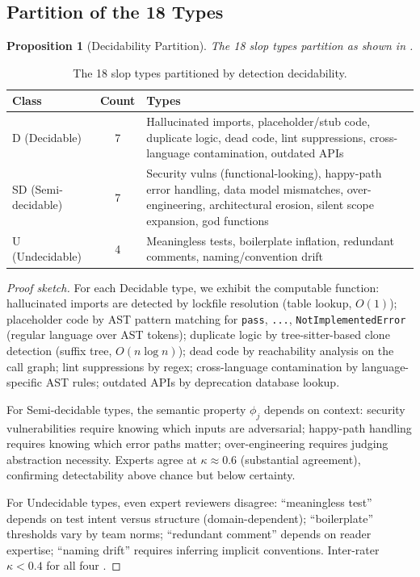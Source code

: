 \documentclass[11pt, a4paper, logo, copyright]{googledeepmind}
\newtheorem{proposition}{Proposition}[section]
\begin{document}
\subsection{Partition of the 18 Types}

\begin{proposition}[Decidability Partition]
\label{prop:partition}
The 18 slop types partition as shown in .
\end{proposition}

\begin{table}[htbp]
\centering
\caption{The 18 slop types partitioned by detection decidability.}
\label{tab:partition}
\small
\begin{tabularx}{\textwidth}{l c X}
\toprule
\textbf{Class} & \textbf{Count} & \textbf{Types} \\
\midrule
D (Decidable) & 7 & Hallucinated imports, placeholder/stub code, duplicate logic, dead code, lint suppressions, cross-language contamination, outdated APIs \\
\addlinespace
SD (Semi-decidable) & 7 & Security vulns (functional-looking), happy-path error handling, data model mismatches, over-engineering, architectural erosion, silent scope expansion, god functions \\
\addlinespace
U (Undecidable) & 4 & Meaningless tests, boilerplate inflation, redundant comments, naming/convention drift \\
\bottomrule
\end{tabularx}
\end{table}

\begin{proof}[Proof sketch]
For each Decidable type, we exhibit the computable function: hallucinated imports are detected by lockfile resolution (table lookup, $O(1)$); placeholder code by AST pattern matching for \texttt{pass}, \texttt{...}, \texttt{NotImplementedError} (regular language over AST tokens); duplicate logic by tree-sitter-based clone detection (suffix tree, $O(n \log n)$); dead code by reachability analysis on the call graph; lint suppressions by regex; cross-language contamination by language-specific AST rules; outdated APIs by deprecation database lookup.

For Semi-decidable types, the semantic property $\phi_j$ depends on context: security vulnerabilities require knowing which inputs are adversarial; happy-path handling requires knowing which error paths matter; over-engineering requires judging abstraction necessity. Experts agree at $\kappa \approx 0.6$ (substantial agreement), confirming detectability above chance but below certainty.

For Undecidable types, even expert reviewers disagree: ``meaningless test'' depends on test intent versus structure (domain-dependent); ``boilerplate'' thresholds vary by team norms; ``redundant comment'' depends on reader expertise; ``naming drift'' requires inferring implicit conventions. Inter-rater $\kappa < 0.4$ for all four \citep{llmjudgetrust2024}.
\end{proof}
\end{document}

